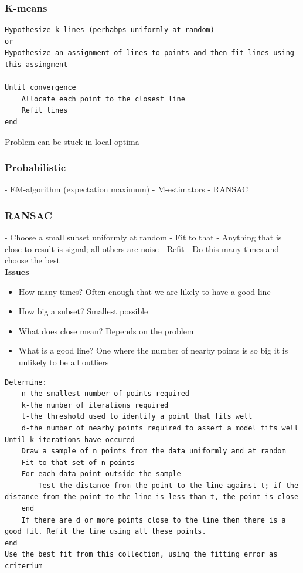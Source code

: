 \subsubsection{K-means}
\begin{lstlisting}[frame=single]
Hypothesize k lines (perhabps uniformly at random)
or
Hypothesize an assignment of lines to points and then fit lines using this assingment

Until convergence
	Allocate each point to the closest line
	Refit lines
end
\end{lstlisting} 

Problem can be stuck in local optima
 
\subsubsection{Probabilistic}
- EM-algorithm (expectation maximum)
- M-estimators
- RANSAC

\subsubsection{RANSAC}

- Choose a small subset uniformly at random
- Fit to that
- Anything that is close to result is signal; all others are noise
- Refit
- Do this many times and choose the best\\

\textbf{Issues} 
\begin{itemize}
	\item How many times? Often enough that we are likely to have a good line
	\item How big a subset? Smallest possible
	\item What does close mean? Depends on the problem
	\item What is a good line? One where the number of nearby points is so big it is unlikely to be all outliers
\end{itemize}


\begin{lstlisting}[frame=single]
Determine:
	n-the smallest number of points required
	k-the number of iterations required
	t-the threshold used to identify a point that fits well
	d-the number of nearby points required to assert a model fits well
Until k iterations have occured
	Draw a sample of n points from the data uniformly and at random
	Fit to that set of n points
	For each data point outside the sample
		Test the distance from the point to the line against t; if the distance from the point to the line is less than t, the point is close
	end
	If there are d or more points close to the line then there is a good fit. Refit the line using all these points.
end
Use the best fit from this collection, using the fitting error as criterium	
\end{lstlisting} 

